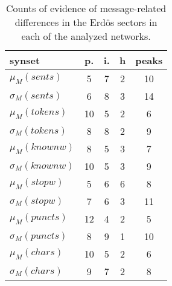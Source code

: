 \begin{table}[h!]
\begin{center}
\begin{tabular}{| l | c | c | c | c |}\hline
synset & p. & i. & h & peaks \\\hline
$\mu_M(sents)$ & 5  & 7  & 2  & 10 \\\hline
$\sigma_M(sents)$ & 6  & 8  & 3  & 14 \\\hline
$\mu_M(tokens)$ & 10  & 5  & 2  & 6 \\\hline
$\sigma_M(tokens)$ & 8  & 8  & 2  & 9 \\\hline
$\mu_M(knownw)$ & 8  & 5  & 3  & 7 \\\hline
$\sigma_M(knownw)$ & 10  & 5  & 3  & 9 \\\hline
$\mu_M(stopw)$ & 5  & 6  & 6  & 8 \\\hline
$\sigma_M(stopw)$ & 7  & 6  & 3  & 11 \\\hline
$\mu_M(puncts)$ & 12  & 4  & 2  & 5 \\\hline
$\sigma_M(puncts)$ & 8  & 9  & 1  & 10 \\\hline
$\mu_M(chars)$ & 10  & 5  & 2  & 6 \\\hline
$\sigma_M(chars)$ & 9  & 7  & 2  & 8 \\\hline
\end{tabular}
\caption{Counts of evidence of message-related differences in the Erd\"os sectors in each of the analyzed networks.}
\end{center}
\end{table}